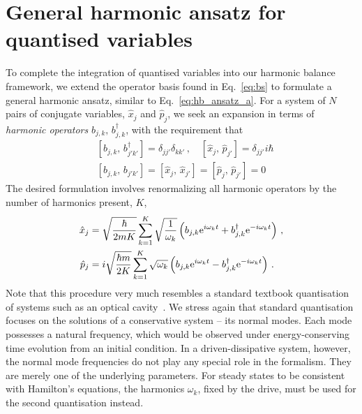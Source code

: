 \section{General harmonic ansatz for quantised variables} \label{sec:rwa_gen}

To complete the integration of quantised variables into our harmonic balance framework, we extend the operator basis found in Eq.~\eqref{eq:bs} to formulate a general harmonic ansatz, similar to Eq.~\eqref{eq:hb_ansatz_a}. For a system of $N$ pairs of conjugate variables, $\hat{x}_j$ and $\hat{p}_j$, we seek an expansion in terms of \textit{harmonic operators} $b_{j,k} ,\, b_{j,k}^\dagger$, with the requirement that
\begin{equation}
\begin{aligned}
&[b_{j,k} , \, b_{j'k'}^\dagger ] = \delta_{jj'} \delta_{kk'} \,, \quad  \left[\hat{x}_j , \, \hat{p}_{j'} \right ] = \delta_{jj'} i \hbar \\
&\left[b_{j,k} , \, b_{j'k'} \right] = \left[\hat{x}_j , \, \hat{x}_{j'} \right ] = \left[ \hat{p}_j ,\, \hat{p}_{j'} \right] = 0 
\end{aligned}
\end{equation}
The desired formulation involves renormalizing all harmonic operators by the number of harmonics present, $K$,
\begin{equation} \label{eq:rwa_general_ansatz}
\begin{aligned}
\hat{x}_j &= \sqrt{\frac{\hbar}{2mK}} \sum_{k=1}^K \sqrt{\frac{1}{\omega_k}} \left( b_{j,k} {\rm e}^{i \omega_k t} + b_{j,k}^{\dagger} {\rm e}^{-i \omega_{k} t} \right) \,, \\
\hat{p}_j &= i\sqrt{\frac{\hbar m}{2K} } \sum_{k=1}^K \sqrt{\omega_k} \left(b_{j,k} {\rm e}^{i \omega_k t} - b_{j,k}^{\dagger} {\rm e}^{-i \omega_{k} t} \right) \,.
\end{aligned}
\end{equation}
Note that this procedure very much resembles a standard textbook quantisation of systems such as an optical cavity~\cite{Walls_Milburn}. We stress again that standard quantisation focuses on the solutions of a conservative system -- its normal modes. Each mode possesses a natural frequency, which would be observed under energy-conserving time evolution from an initial condition. In a driven-dissipative system, however, the normal mode frequencies do not play any special role in the formalism. They are merely one of the underlying parameters. For steady states to be consistent with Hamilton's equations, the harmonics $\omega_k$, fixed by the drive, must be used for the second quantisation instead.

